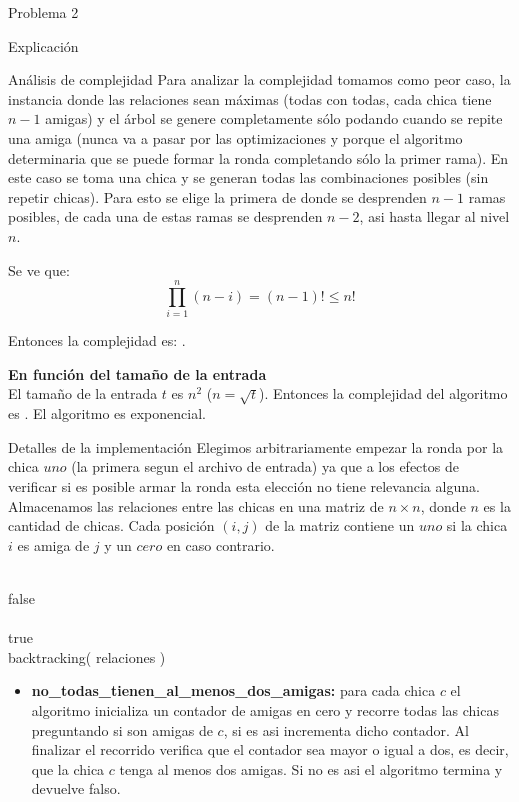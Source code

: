 \begin{section}{Problema 2}
\begin{subsection}{Explicación}
\begin{subsubsection}{Análisis de complejidad}
			Para analizar la complejidad tomamos como peor caso, la instancia donde las relaciones sean máximas (todas con todas, cada chica tiene $n-1$ amigas) y el árbol se genere completamente sólo podando cuando se repite una amiga  (nunca va a pasar por las optimizaciones y porque el algoritmo determinaria que se puede formar la ronda completando sólo la primer rama). En este caso se toma una chica y se generan todas las combinaciones posibles (sin repetir chicas). Para esto se elige la primera de donde se desprenden $n-1$ ramas posibles, de cada una de estas ramas se desprenden $n-2$, asi hasta llegar al nivel $n$.

			Se ve que: $$\displaystyle\prod_{i=1}^n (n-i) = (n-1)! \leq n!$$

			Entonces la complejidad es:  .\VSP
		
			\noindent\textbf{En función del tamaño de la entrada}\\

				El tamaño de la entrada $t$ es $n^2$ ($n=\sqrt t$). Entonces la complejidad del algoritmo es . El algoritmo es exponencial.
		\end{subsubsection}
	\end{subsection}

	\begin{subsection}{Detalles de la implementación}
		Elegimos arbitrariamente empezar la ronda por la chica $uno$ (la primera segun el archivo de entrada) ya que a los efectos de verificar si es posible armar la ronda esta elección no tiene relevancia alguna.\\
	
		Almacenamos las relaciones entre las chicas en una matriz de $n \times n$, donde $n$ es la cantidad de chicas. Cada posición $(i,j)$ de la matriz contiene un $uno$ si la chica $i$ es amiga de $j$ y un $cero$ en caso contrario.\VSP

		\begin{pseudo}
			\tab{} \\
			\tab\tab \RET false \\
			\tab{} \\
			\tab\tab \RET true \\
			\tab backtracking( relaciones )
		\end{pseudo}

		\begin{itemize}
			\item \textbf{no\_todas\_tienen\_al\_menos\_dos\_amigas:} para cada chica $c$ el algoritmo inicializa un contador de amigas en cero y recorre todas las chicas preguntando si son amigas de $c$, si es asi incrementa dicho contador. Al finalizar el recorrido verifica que el contador sea mayor o igual a dos, es decir, que la chica $c$ tenga al menos dos amigas. Si no es asi el algoritmo termina y devuelve falso.


\end{itemize}
\end{subsection}
\end{section}
